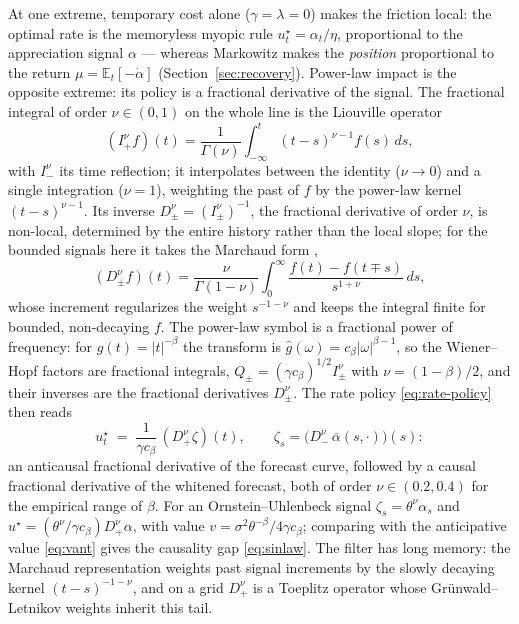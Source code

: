 \documentclass[11pt]{article}
\newcommand{\E}{\mathbb{E}}
\theoremstyle{plain}
\theoremstyle{definition}
\theoremstyle{remark}
\begin{document}
At one extreme, temporary cost alone ($\gamma=\lambda=0$) makes the friction local: the optimal rate is the memoryless myopic rule $u^\star_t=\alpha_t/\eta$, proportional to the appreciation signal $\alpha$ --- whereas Markowitz makes the \emph{position} proportional to the return $\mu=\E_t[-\dot\alpha]$ (Section~\ref{sec:recovery}). Power-law impact is the opposite extreme: its policy is a fractional derivative of the signal. The fractional integral of order $\nu\in(0,1)$ on the whole line is the Liouville operator
\[
(I^\nu_+f)(t)=\frac{1}{\Gamma(\nu)}\int_{-\infty}^t(t-s)^{\nu-1}f(s)\,ds,
\]
with $I^\nu_-$ its time reflection; it interpolates between the identity ($\nu\to0$) and a single integration ($\nu=1$), weighting the past of $f$ by the power-law kernel $(t-s)^{\nu-1}$. Its inverse $D^\nu_\pm=(I^\nu_\pm)^{-1}$, the fractional derivative of order $\nu$, is non-local, determined by the entire history rather than the local slope; for the bounded signals here it takes the Marchaud form \citep{SamkoKilbasMarichev1993},
\[
(D^\nu_\pm f)(t)=\frac{\nu}{\Gamma(1-\nu)}\int_0^\infty\frac{f(t)-f(t\mp s)}{s^{1+\nu}}\,ds,
\]
whose increment regularizes the weight $s^{-1-\nu}$ and keeps the integral finite for bounded, non-decaying $f$. The power-law symbol is a fractional power of frequency: for $g(t)=|t|^{-\beta}$ the transform is $\hat g(\omega)=c_\beta|\omega|^{\beta-1}$, so the Wiener--Hopf factors are fractional integrals, $Q_\pm=(\gamma c_\beta)^{1/2}I^\nu_\pm$ with $\nu=(1-\beta)/2$, and their inverses are the fractional derivatives $D^\nu_\pm$. The rate policy \eqref{eq:rate-policy} then reads
\begin{equation}\label{eq:fractional}
u^\star_t \;=\; \frac{1}{\gamma c_\beta}\,(D_+^\nu\zeta)(t), \qquad
\zeta_s = \bigl(D_-^\nu\,\bar\alpha(s,\cdot)\bigr)(s):
\end{equation}
an anticausal fractional derivative of the forecast curve, followed by a causal fractional derivative of the whitened forecast, both of order $\nu\in(0.2,0.4)$ for the empirical range of $\beta$. For an Ornstein--Uhlenbeck signal $\zeta_s=\theta^\nu\alpha_s$ and $u^\star=(\theta^\nu/\gamma c_\beta)D^\nu_+\alpha$, with value $v=\sigma^2\theta^{-\beta}/4\gamma c_\beta$; comparing with the anticipative value \eqref{eq:vant} gives the causality gap \eqref{eq:sinlaw}. The filter has long memory: the Marchaud representation weights past signal increments by the slowly decaying kernel $(t-s)^{-1-\nu}$, and on a grid $D^\nu_+$ is a Toeplitz operator whose Gr\"unwald--Letnikov weights inherit this tail.
\end{document}
